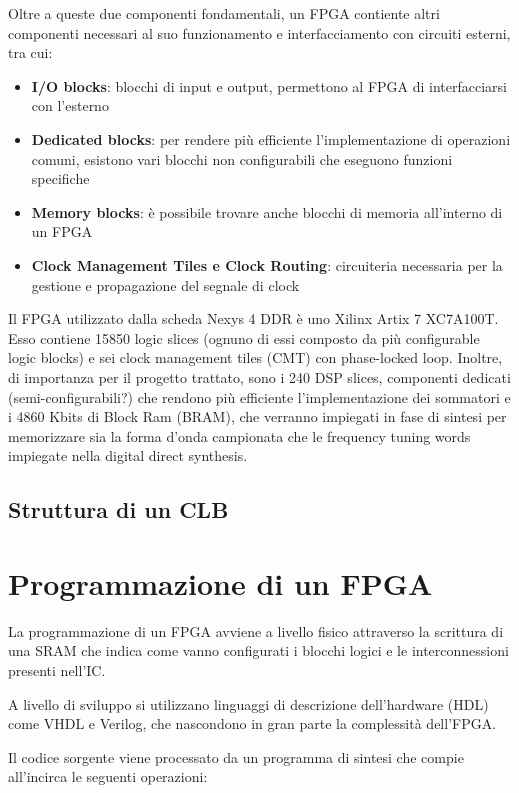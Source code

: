 Oltre a queste due componenti fondamentali, un FPGA contiente altri
componenti necessari al suo funzionamento e interfacciamento con
circuiti esterni, tra cui:

\begin{itemize}
    \item \textbf{I/O blocks}: blocchi di input e output,
           permettono al FPGA di interfacciarsi con l'esterno
    \item \textbf{Dedicated blocks}: per rendere più efficiente
           l'implementazione di operazioni comuni, esistono vari blocchi
           non configurabili che eseguono funzioni specifiche
    \item \textbf{Memory blocks}: è possibile trovare anche blocchi di
           memoria all'interno di un FPGA
    \item \textbf{Clock Management Tiles e Clock Routing}: circuiteria necessaria per 
           la gestione e propagazione del segnale di clock
\end{itemize}

Il FPGA utilizzato dalla scheda Nexys 4 DDR è uno Xilinx Artix 7 XC7A100T.
Esso contiene 15850 logic slices (ognuno di essi composto da più
configurable logic blocks) e sei clock management tiles (CMT) con
phase-locked loop.
Inoltre, di importanza per il progetto trattato, sono i 240 DSP slices, 
componenti dedicati (semi-configurabili?) che rendono più efficiente
l'implementazione dei sommatori e i 4860 Kbits di Block Ram (BRAM),
che verranno impiegati in fase di sintesi per memorizzare sia la forma
d'onda campionata che le frequency tuning words impiegate nella digital
direct synthesis.

\subsection{Struttura di un CLB}

\section{Programmazione di un FPGA}
La programmazione di un FPGA avviene a livello fisico attraverso
la scrittura di una SRAM che indica come vanno configurati i blocchi
logici e le interconnessioni presenti nell'IC.

A livello di sviluppo si utilizzano linguaggi di descrizione dell'hardware
(HDL) come VHDL e Verilog, che nascondono in gran parte la complessità
dell'FPGA.

Il codice sorgente viene processato da un programma di sintesi che compie
all'incirca le seguenti operazioni:

